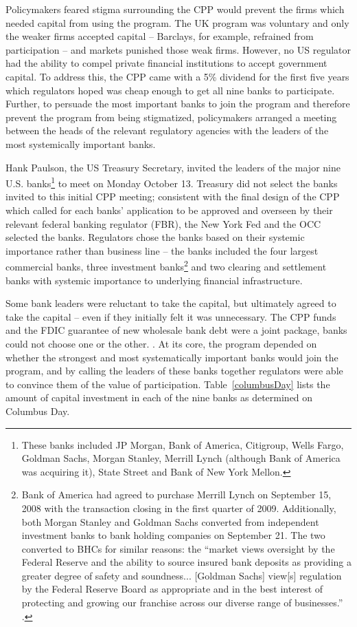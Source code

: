 \documentclass[12pt]{article}
\begin{document}
Policymakers feared stigma surrounding the CPP would prevent the firms which needed capital from using the program. The UK program was voluntary and only the weaker firms accepted capital -- Barclays, for example, refrained from participation -- and markets punished those weak firms. However, no US regulator had the ability to compel private financial institutions to accept government capital. To address this, the CPP came with a 5\% dividend for the first five years which regulators hoped was cheap enough to get all nine banks to participate. Further, to persuade the most important banks to join the program and therefore prevent the program from being stigmatized, policymakers arranged a meeting between the heads of the relevant regulatory agencies with the leaders of the most systemically important banks.  

Hank Paulson, the US Treasury Secretary, invited the leaders of the major nine U.S. banks\footnote{These banks included JP Morgan, Bank of America, Citigroup, Wells Fargo, Goldman Sachs, Morgan Stanley, Merrill Lynch (although Bank of America was acquiring it), State Street and Bank of New York Mellon.} to meet on Monday October 13. Treasury did not select the banks invited to this initial CPP meeting; consistent with the final design of the CPP which called for each banks' application to be approved and overseen by their relevant federal banking regulator (FBR), the New York Fed and the OCC selected the banks. Regulators chose the banks based on their systemic importance rather than business line -- the banks included the four largest commercial banks, three investment banks\footnote{Bank of America had  agreed to purchase Merrill Lynch on September 15, 2008 with the transaction closing in the first quarter of 2009. Additionally, both Morgan Stanley and Goldman Sachs converted from independent investment banks to bank holding companies on September 21. The two converted to BHCs for similar reasons: the ``market views oversight by the Federal Reserve and the ability to source insured bank deposits as providing a greater degree of safety and soundness... [Goldman Sachs] view[s] regulation by the Federal Reserve Board as appropriate and in the best interest of protecting and growing our franchise across our diverse range of businesses.'' \citep{GSBHC}.} and two clearing and settlement banks with systemic importance to underlying financial infrastructure.  

Some bank leaders were reluctant to take the capital, but ultimately agreed to take the capital -- even if they initially felt it was unnecessary. The CPP funds and the FDIC guarantee of new wholesale bank debt were a joint package, banks could not choose one or the other. \citep{Geithner}. At its core, the program depended on whether the strongest and most systematically important banks would join the program, and by calling the leaders of these banks together regulators were able to convince them of the value of participation. Table~\ref{columbusDay} lists the amount of capital investment in each of the nine banks as determined on Columbus Day. 
\end{document}
